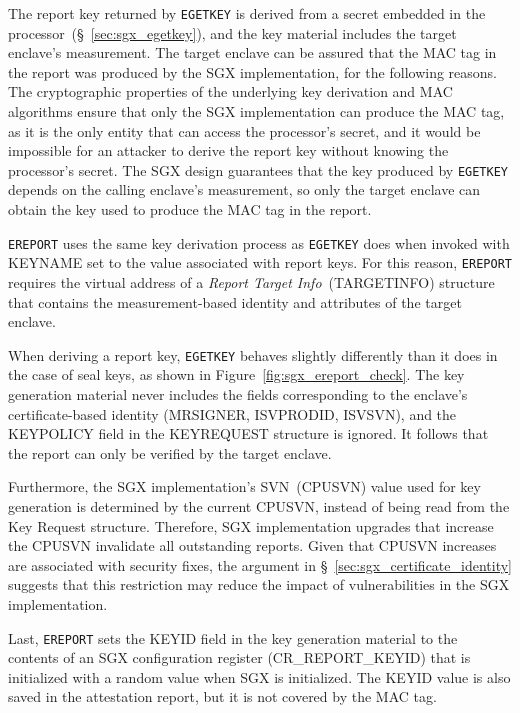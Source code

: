 The report key returned by \texttt{EGETKEY} is derived from a secret embedded
in the processor~(\S~\ref{sec:sgx_egetkey}), and the key material includes the
target enclave's measurement. The target enclave can be assured that the MAC
tag in the report was produced by the SGX implementation, for the following
reasons. The cryptographic properties of the underlying key derivation and
MAC algorithms ensure that only the SGX implementation can produce the MAC tag,
as it is the only entity that can access the processor's secret, and it would be
impossible for an attacker to derive the report key without knowing the
processor's secret. The SGX design guarantees that the key produced by
\texttt{EGETKEY} depends on the calling enclave's measurement, so only the
target enclave can obtain the key used to produce the MAC tag in the report.

\texttt{EREPORT} uses the same key derivation process as \texttt{EGETKEY}
does when invoked with KEYNAME set to the value associated with report keys.
For this reason, \texttt{EREPORT} requires the virtual address of a
\textit{Report Target Info}~(TARGETINFO) structure that contains the
measurement-based identity and attributes of the target enclave.


When deriving a report key, \texttt{EGETKEY} behaves slightly differently than
it does in the case of seal keys, as shown in
Figure~\ref{fig:sgx_ereport_check}. The key generation material never includes
the fields corresponding to the enclave's certificate-based identity (MRSIGNER,
ISVPRODID, ISVSVN), and the KEYPOLICY field in the KEYREQUEST structure is
ignored. It follows that the report can only be verified by the target enclave.

Furthermore, the SGX implementation's SVN~(CPUSVN) value used for key generation
is determined by the current CPUSVN, instead of being read from the Key Request
structure. Therefore, SGX implementation upgrades that increase the CPUSVN
invalidate all outstanding reports. Given that CPUSVN increases are associated
with security fixes, the argument in \S~\ref{sec:sgx_certificate_identity}
suggests that this restriction may reduce the impact of vulnerabilities in the
SGX implementation.

Last, \texttt{EREPORT} sets the KEYID field in the key generation material to
the contents of an SGX configuration register (CR\_REPORT\_KEYID) that is
initialized with a random value when SGX is initialized. The KEYID value is
also saved in the attestation report, but it is not covered by the MAC tag.


